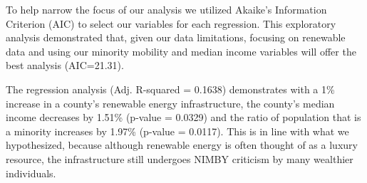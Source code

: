 \documentclass[
  12pt,
]{article}
\begin{document}
To help narrow the focus of our analysis we utilized Akaike's
Information Criterion (AIC) to select our variables for each regression.
This exploratory analysis demonstrated that, given our data limitations,
focusing on renewable data and using our minority mobility and median
income variables will offer the best analysis (AIC=21.31).

The regression analysis (Adj. R-squared = 0.1638) demonstrates with a
1\% increase in a county's renewable energy infrastructure, the county's
median income decreases by 1.51\% (p-value = 0.0329) and the ratio of
population that is a minority increases by 1.97\% (p-value = 0.0117).
This is in line with what we hypothesized, because although renewable
energy is often thought of as a luxury resource, the infrastructure
still undergoes NIMBY criticism by many wealthier individuals.
\end{document}
